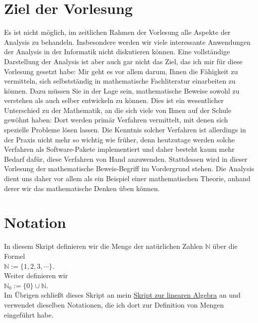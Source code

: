 \section{Ziel der Vorlesung}
Es ist nicht m\"oglich, im zeitlichen Rahmen der Vorlesung alle Aspekte der Analysis zu behandeln.
Insbesondere werden wir viele interessante Anwendungen der Analysis in der Informatik nicht
diskutieren k\"onnen.  Eine vollst\"andige Darstellung der Analysis ist aber auch gar nicht das Ziel,
das ich mir f\"ur diese Vorlesung gesetzt habe:  Mir geht es vor allem  darum, Ihnen die F\"ahigkeit zu
vermitteln, sich selbstst\"andig in mathematische Fachliteratur einarbeiten zu k\"onnen.  Dazu m\"ussen
Sie in der Lage 
sein, mathematische Beweise sowohl zu verstehen als auch selber entwickeln zu k\"onnen.   Dies ist ein
wesentlicher Unterschied zu der Mathematik, an die sich viele von Ihnen auf der Schule gew\"ohnt haben:
Dort werden prim\"ar Verfahren vermittelt, mit denen sich spezielle Probleme l\"osen lassen.  Die Kenntnis
solcher Verfahren ist allerdings in der Praxis nicht mehr so wichtig wie fr\"uher, denn heutzutage
werden solche Verfahren als Software-Pakete implementiert und daher besteht kaum mehr Bedarf daf\"ur,
diese Verfahren von Hand anzuwenden.  Stattdessen wird in
dieser Vorlesung der mathematische Beweis-Begriff im Vordergrund stehen.  Die Analysis dient uns
daher vor allem als ein Beispiel einer mathematischen Theorie, anhand derer wir das mathematische 
Denken \"uben k\"onnen. 

\section{Notation}
In diesem Skript definieren wir die Menge der nat\"urlichen Zahlen $\mathbb{N}$ \"uber die Formel
\\[0.2cm]
\hspace*{1.3cm}
$\mathbb{N} := \{ 1, 2, 3, \cdots \}$.
\\[0.2cm]
Weiter definieren wir
\\[0.2cm]
\hspace*{1.3cm}
$\mathbb{N}_0 := \{ 0 \} \cup \mathbb{N}$.
\\[0.2cm]
Im \"Ubrigen schlie\ss{}t dieses Skript an mein
\href{https://github.com/karlstroetmann/Lineare-Algebra/blob/master/Script/lineare-algebra.pdf}{Skript zur linearen Algebra} 
an und verwendet dieselben Notationen, die ich dort zur Definition von Mengen eingef\"uhrt habe.
\pagebreak

